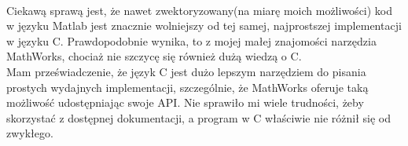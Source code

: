 \documentclass[12pt, flegn, leqno]{article}
\begin{document}
        \paragraph{}
        Ciekawą sprawą jest, że nawet zwektoryzowany(na miarę moich możliwości) kod w języku
        Matlab jest znacznie wolniejszy od tej samej, najprostszej implementacji w języku C.
        Prawdopodobnie wynika, to z mojej małej znajomości narzędzia MathWorks, chociaż
        nie szczycę się również dużą wiedzą o C. \\
        \indent Mam przeświadczenie, że język C jest dużo lepszym narzędziem do pisania prostych wydajnych
        implementacji, szczególnie, że MathWorks oferuje taką możliwość udostępniając swoje API.
        Nie sprawiło mi wiele trudności, żeby skorzystać z dostępnej dokumentacji, a program w C 
        właściwie nie różnił się od zwykłego.
\end{document}
